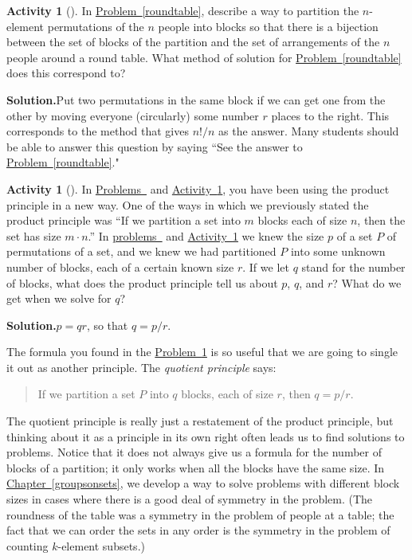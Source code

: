 \documentclass[10pt,]{book}
\theoremstyle{plain}
\theoremstyle{definition}
\newtheorem{activity}[project]{Activity}
\numberwithin{equation}{chapter}
\begin{document}
\begin{activity}[]\label{roundtablepartition}
In \hyperref[roundtable]{Problem~\ref{roundtable}}, describe a way to partition the \(n\)-element permutations of the \(n\) people into blocks so that there is a bijection between the set of blocks of the partition and the set of arrangements of the \(n\) people around a round table. What method of solution for \hyperref[roundtable]{Problem~\ref{roundtable}} does this correspond to?%
\par\medskip\noindent%
\textbf{Solution.}\quad Put two permutations in the same block if we can get one from the other by moving everyone (circularly) some number \(r\) places to the right. This corresponds to the method that gives \(n!/n\) as the answer. Many students should be able to answer this question by saying ``See the answer to \hyperref[roundtable]{Problem~\ref{roundtable}}."%
\end{activity}
\begin{activity}[]\label{quotientprinciple}
In \hyperref[formulanchoosekfinal]{Problems~} and \hyperref[roundtablepartition]{Activity~\ref{roundtablepartition}}, you have been using the product principle in a new way. One of the ways in which we previously stated the product principle was ``If we partition a set into \(m\) blocks each of size \(n\), then the set has size \(m\cdot n\).'' In \hyperref[formulanchoosekfinal]{problems~} and \hyperref[roundtablepartition]{Activity~\ref{roundtablepartition}} we knew the size \(p\) of a set \(P\) of permutations of a set, and we knew we had partitioned \(P\) into some unknown number of blocks, each of a certain known size \(r\). If we let \(q\) stand for the number of blocks, what does the product principle tell us about \(p\), \(q\), and \(r\)? What do we get when we solve for \(q\)?%
\par\medskip\noindent%
\textbf{Solution.}\quad \(p=qr\), so that \(q=p/r\).%
\end{activity}
The formula you found in the \hyperref[quotientprinciple]{Problem~\ref{quotientprinciple}} is so useful that we are going to single it out as another principle. The \emph{quotient principle} says:%
\begin{quote}\hypertarget{blockquote-4}{}
If we partition a set \(P\) into \(q\) blocks, each of size \(r\), then \(q=p/r.\)\end{quote}
The quotient principle is really just a restatement of the product principle, but thinking about it as a principle in its own right often leads us to find solutions to problems. Notice that it does not always give us a formula for the number of blocks of a partition; it only works when all the blocks have the same size. In \hyperref[groupsonsets]{Chapter~\ref{groupsonsets}}, we develop a way to solve problems with different block sizes in cases where there is a good deal of symmetry in the problem. (The roundness of the table was a symmetry in the problem of people at a table; the fact that we can order the sets in any order is the symmetry in the problem of counting \(k\)-element subsets.)%
\end{document}
